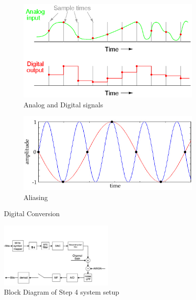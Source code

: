 \documentclass[]{article}
\begin{document}
\begin{figure}[h]
        \centering
        \begin{subfigure}[b]{0.4\textwidth}
                \includegraphics[width=\textwidth]{digitization.png}
                \caption{Analog and Digital signals}
                \label{fig:digitization}
        \end{subfigure}%
        \qquad \quad %
        \begin{subfigure}[b]{0.5\textwidth}
                \includegraphics[width=\textwidth]{aliasing.jpg}
                \caption{Aliasing \label{fig:alias} \cite{aliasing}}
                \label{fig:alias}
        \end{subfigure}
        \caption{Digital Conversion \label{fig:digitize}}
\end{figure}

\begin{figure}[H]
\centering
\includegraphics[width=0.5\textwidth]{step4.png}
\caption{Block Diagram of Step 4 system setup }
\end{figure}
\end{document}
